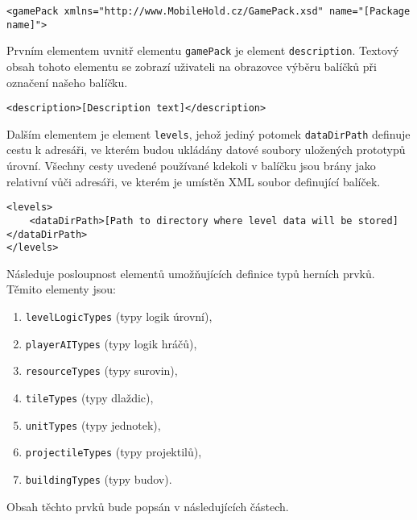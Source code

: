 \lstset{
	language=XML
}
\begin{lstlisting}
<gamePack xmlns="http://www.MobileHold.cz/GamePack.xsd" name="[Package name]">
\end{lstlisting}

Prvním elementem uvnitř elementu \texttt{gamePack} je element \texttt{description}. Textový obsah tohoto elementu se zobrazí uživateli na obrazovce výběru balíčků při označení našeho balíčku.
\begin{lstlisting}
<description>[Description text]</description>
\end{lstlisting}

Dalším elementem je element \texttt{levels}, jehož jediný potomek \texttt{dataDirPath} definuje cestu k adresáři, ve kterém budou ukládány datové soubory uložených prototypů úrovní. Všechny cesty uvedené používané kdekoli v balíčku jsou brány jako relativní vůči adresáři, ve kterém je umístěn XML soubor definující balíček.
\begin{lstlisting}
<levels>
	<dataDirPath>[Path to directory where level data will be stored]</dataDirPath>
</levels>
\end{lstlisting}

Následuje posloupnost elementů umožňujících definice typů herních prvků. Těmito elementy jsou:

\begin{enumerate}
	\item \texttt{levelLogicTypes} (typy logik úrovní),
	\item \texttt{playerAITypes} (typy logik hráčů),
	\item \texttt{resourceTypes} (typy surovin),
	\item \texttt{tileTypes} (typy dlaždic),
	\item \texttt{unitTypes} (typy jednotek),
	\item \texttt{projectileTypes} (typy projektilů),
	\item \texttt{buildingTypes} (typy budov).
\end{enumerate}
Obsah těchto prvků bude popsán v následujících částech. 

